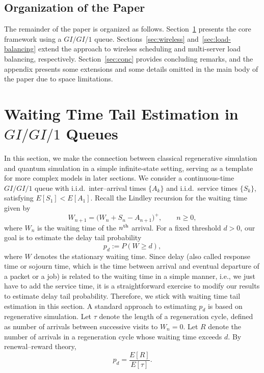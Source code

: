 \documentclass[11pt]{article}
\begin{document}
\subsection{Organization of the Paper} 
The remainder of the paper is organized as follows. 
Section~\ref{sec:G-G-1} presents the core framework using a $GI/GI/1$ queue. 
Sections~\ref{sec:wireless} and~\ref{sec:load-balancing} extend the approach to wireless scheduling and multi-server load balancing, respectively. 
Section~\ref{sec:conc} provides concluding remarks, and the appendix presents some extensions and some details omitted in the main body of the paper due to space limitations.


\section{Waiting Time Tail Estimation in $GI/GI/1$ Queues}\label{sec:G-G-1}

In this section, we make the connection between classical regenerative simulation and quantum simulation in a simple infinite-state setting, serving as a template for more complex models in later sections. We consider a continuous-time $GI/GI/1$ queue with i.i.d.\ inter--arrival times
$\{A_k\}$ and i.i.d.\ service times $\{S_k\}$, satisfying
$E[S_1] < E[A_1]$.
Recall the Lindley recursion for the waiting time given by
\begin{equation}
\label{eq:lindley}
W_{n+1} = \bigl(W_n + S_n - A_{n+1}\bigr)^+,\qquad n\ge 0,
\end{equation}
where $W_n$ is the waiting time of the $n^{\rm th}$ arrival.
For a fixed threshold $d > 0$, our goal is to estimate the
delay tail probability
\[
p_d := P(W \ge d),
\]
where $W$ denotes the stationary waiting time.
Since delay (also called response time or sojourn time, which is the time between arrival and eventual departure of a packet or a job) is related to the waiting time in a simple manner, i.e., we just have to add the service time, it is a straightforward exercise to modify our results to estimate delay tail probability.
Therefore, we stick with waiting time tail estimation in this section.
A standard approach to estimating $p_d$ is based on regenerative simulation.
Let $\tau$ denote the length of a regeneration cycle, defined as number of arrivals between successive visits to $W_n=0$.
Let $R$ denote the
number of arrivals in a regeneration cycle whose waiting time exceeds $d$. By
renewal--reward theory,
\[
p_d = \frac{E[R]}{E[\tau]}.
\]
\end{document}
